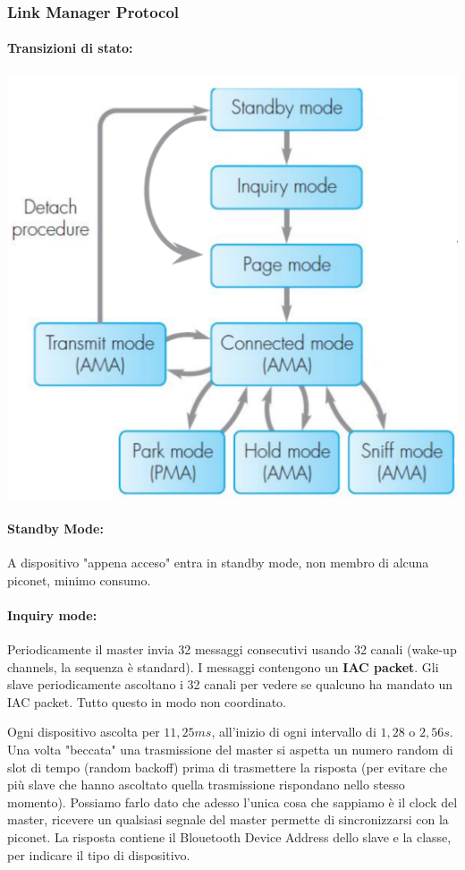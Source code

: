 \subsubsection{Link Manager Protocol}
\paragraph{Transizioni di stato:}
\begin{center}
	\includegraphics[width=0.55\linewidth]{img/wpan/lmpst}
\end{center}

\paragraph{Standby Mode:} A dispositivo "appena acceso" entra in standby mode, non membro di alcuna piconet, minimo consumo.

\paragraph{Inquiry mode:} Periodicamente il master invia 32 messaggi consecutivi usando 32 canali (wake-up channels, la sequenza  è standard). I messaggi contengono un \textbf{IAC packet}. Gli slave periodicamente ascoltano i 32 canali per vedere se qualcuno ha mandato un IAC packet. Tutto questo in modo non coordinato.

Ogni dispositivo ascolta per $11,25 ms$, all'inizio di ogni intervallo di $1,28$ o $2,56 s$. Una volta "beccata" una trasmissione del master si aspetta un numero random di slot di tempo (random backoff) prima di trasmettere la risposta (per evitare che più slave che hanno ascoltato quella trasmissione rispondano nello stesso momento). Possiamo farlo dato che adesso l'unica cosa che sappiamo è il clock del master, ricevere un qualsiasi segnale del master permette di sincronizzarsi con la piconet. La risposta contiene il Blouetooth Device Address dello slave e la classe, per indicare il tipo di dispositivo.

